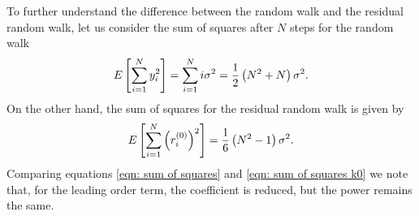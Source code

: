 \documentclass[../full_thesis/full_thesis.tex]{subfiles}
\begin{document}
\begin{subappendices}
To further understand the difference between the random walk and
the residual random walk, let us consider the sum of squares after $N$ steps for
the random walk
\begin{equation}
E\left[\sum_{i=1}^{N} y_{i}^{2}\right] = \sum_{i=1}^{N} i \sigma^{2} =
                               \frac{1}{2}\left(N^{2} + N\right)\sigma^{2}.
\label{eqn: sum of squares}
\end{equation}
On the other hand, the sum of squares for the residual random walk is given by
\begin{equation}
E\left[\sum_{i=1}^{N} \left(r^{(0)}_{i}\right)^{2}\right] = 
\frac{1}{6}\left(N^{2} -1\right)\sigma^{2}.
\label{eqn: sum of squares k0}
\end{equation}
Comparing equations \eqref{eqn: sum of squares} and \eqref{eqn: sum of squares
k0} we note that, for the leading order term, the coefficient is reduced, but
the power remains the same.

%


\end{subappendices}
\end{document}
